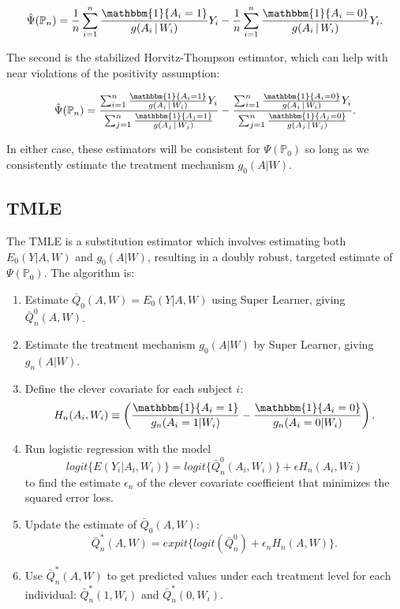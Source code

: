 \documentclass[english, 12pt]{article}
\def\P{\mathbb{P}}
\def\ind{\mathbbm{1}}
\def\giv{{\,|\,}}
\begin{document}
$$\hat{\Psi}(\P_n) = \frac{1}{n} \sum_{i=1}^n \frac{\ind\{A_i = 1\}}{g(A_i \giv W_i)} Y_i - \frac{1}{n} \sum_{i=1}^n \frac{\ind\{A_i = 0 \}}{g(A_i \giv W_i)} Y_i.$$

The second is the stabilized Horvitz-Thompson estimator, which can help with near violations of the positivity assumption:

$$\hat{\Psi}(\P_n) = \frac{\sum_{i=1}^n \frac{\ind\{A_i = 1\}}{g(A_i \giv W_i)} Y_i}{\sum_{j=1}^n \frac{\ind\{A_j = 1\}}{g(A_j \giv W_j)}} - \frac{\sum_{i=1}^n \frac{\ind\{A_i = 0 \}}{g(A_i \giv W_i)}Y_i}{\sum_{j=1}^n \frac{\ind\{A_j = 0\}}{g(A_j \giv W_j)}}.$$

In either case, these estimators will be consistent for $\Psi(\P_0)$ so long as we consistently estimate the treatment mechanism $g_0(A|W)$.

\subsection{TMLE}

The TMLE is a substitution estimator which involves estimating both $E_0(Y | A, W)$ and $g_0(A|W)$, resulting in a doubly robust, targeted estimate of $\Psi(\P_0)$. The algorithm is:

\begin{enumerate}
    \item Estimate $\bar{Q}_0(A, W) = E_0(Y | A, W)$ using Super Learner, giving $\bar{Q}_n^0(A, W)$.
    \item Estimate the treatment mechanism $g_0(A|W)$ by Super Learner, giving $g_n(A|W)$.
    \item Define the clever covariate for each subject $i$:
    $$H_n(A_i, W_i) \equiv \left( \frac{\ind\{A_i = 1\}}{g_n(A_i = 1|W_i)} - \frac{\ind\{A_i = 0\}}{g_n(A_i = 0 | W_i)} \right).$$
    \item Run logistic regression with the model
    $$ logit\{E(Y_i|A_i, W_i)\} = logit\{\bar{Q}_n^0(A_i, W_i)\} + \epsilon H_n(A_i, Wi) $$
    to find the estimate $\epsilon_n$ of the clever covariate coefficient that minimizes the squared error loss.
    \item Update the estimate of $\bar{Q}_0(A, W)$:
    $$\bar{Q}^*_n(A, W) = expit\{logit(\bar{Q}_n^0) + \epsilon_n H_n(A,W)\}.$$
    \item Use $\bar{Q}^*_n(A, W)$ to get predicted values under each treatment level for each individual: $\bar{Q}^*_n(1, W_i)$ and $\bar{Q}^*_n(0, W_i)$.
\end{enumerate}
\end{document}
